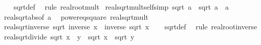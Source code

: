 \begin{isabellebody}
%
\isadelimproof
\ \ %
\endisadelimproof
%
\isatagproof
{}\isamarkupfalse%
\ sqrt{\isacharunderscore}{\kern0pt}def\ \isamarkupfalse%
\ {\isacharparenleft}{\kern0pt}rule\ real{\isacharunderscore}{\kern0pt}root{\isacharunderscore}{\kern0pt}mult{\isacharparenright}{\kern0pt}%
\endisatagproof
{\isafoldproof}%
%
\isadelimproof
\isanewline
%
\endisadelimproof
\isanewline
{}\isamarkupfalse%
\ real{\isacharunderscore}{\kern0pt}sqrt{\isacharunderscore}{\kern0pt}mult{\isacharunderscore}{\kern0pt}self{\isacharbrackleft}{\kern0pt}simp{\isacharbrackright}{\kern0pt}{\isacharcolon}{\kern0pt}\ {\isachardoublequoteopen}sqrt\ a\ {\isacharasterisk}{\kern0pt}\ sqrt\ a\ {\isacharequal}{\kern0pt}\ {\isasymbar}a{\isasymbar}{\isachardoublequoteclose}\isanewline
%
\isadelimproof
\ \ %
\endisadelimproof
%
\isatagproof
{}\isamarkupfalse%
\ real{\isacharunderscore}{\kern0pt}sqrt{\isacharunderscore}{\kern0pt}abs{\isacharbrackleft}{\kern0pt}of\ a{\isacharbrackright}{\kern0pt}\ \isamarkupfalse%
\ power{}{\isacharunderscore}{\kern0pt}eq{\isacharunderscore}{\kern0pt}square\ real{\isacharunderscore}{\kern0pt}sqrt{\isacharunderscore}{\kern0pt}mult\ \isacommand{{\isachardot}{\kern0pt}}\isamarkupfalse%
%
\endisatagproof
{\isafoldproof}%
%
\isadelimproof
\isanewline
%
\endisadelimproof
\isanewline
{}\isamarkupfalse%
\ real{\isacharunderscore}{\kern0pt}sqrt{\isacharunderscore}{\kern0pt}inverse{\isacharcolon}{\kern0pt}\ {\isachardoublequoteopen}sqrt\ {\isacharparenleft}{\kern0pt}inverse\ x{\isacharparenright}{\kern0pt}\ {\isacharequal}{\kern0pt}\ inverse\ {\isacharparenleft}{\kern0pt}sqrt\ x{\isacharparenright}{\kern0pt}{\isachardoublequoteclose}\isanewline
%
\isadelimproof
\ \ %
\endisadelimproof
%
\isatagproof
{}\isamarkupfalse%
\ sqrt{\isacharunderscore}{\kern0pt}def\ \isamarkupfalse%
\ {\isacharparenleft}{\kern0pt}rule\ real{\isacharunderscore}{\kern0pt}root{\isacharunderscore}{\kern0pt}inverse{\isacharparenright}{\kern0pt}%
\endisatagproof
{\isafoldproof}%
%
\isadelimproof
\isanewline
%
\endisadelimproof
\isanewline
{}\isamarkupfalse%
\ real{\isacharunderscore}{\kern0pt}sqrt{\isacharunderscore}{\kern0pt}divide{\isacharcolon}{\kern0pt}\ {\isachardoublequoteopen}sqrt\ {\isacharparenleft}{\kern0pt}x\ {\isacharslash}{\kern0pt}\ y{\isacharparenright}{\kern0pt}\ {\isacharequal}{\kern0pt}\ sqrt\ x\ {\isacharslash}{\kern0pt}\ sqrt\ y{\isachardoublequoteclose}\isanewline
%
\isadelimproof
\ \ %
\endisadelimproof
%
\isatagproof
{}\isamarkupfalse%

\end{isabellebody}
